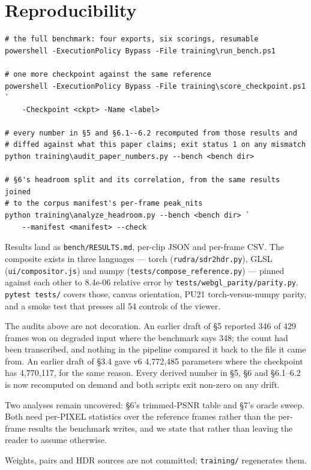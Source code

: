 \hypertarget{reproducibility}{%
\section{Reproducibility}\label{reproducibility}}

\begin{verbatim}
# the full benchmark: four exports, six scorings, resumable
powershell -ExecutionPolicy Bypass -File training\run_bench.ps1

# one more checkpoint against the same reference
powershell -ExecutionPolicy Bypass -File training\score_checkpoint.ps1 `
    -Checkpoint <ckpt> -Name <label>

# every number in §5 and §6.1--6.2 recomputed from those results and
# diffed against what this paper claims; exit status 1 on any mismatch
python training\audit_paper_numbers.py --bench <bench dir>

# §6's headroom split and its correlation, from the same results joined
# to the corpus manifest's per-frame peak_nits
python training\analyze_headroom.py --bench <bench dir> `
    --manifest <manifest> --check
\end{verbatim}

Results land as \texttt{bench/RESULTS.md}, per-clip JSON and per-frame CSV. The
composite exists in three languages --- torch (\texttt{rudra/sdr2hdr.py}), GLSL
(\texttt{ui/compositor.js}) and numpy (\texttt{tests/compose\_reference.py}) --- pinned against
each other to 8.4e-06 relative error by \texttt{tests/webgl\_parity/parity.py}.
\texttt{pytest\ tests/} covers those, canvas orientation, PU21 torch-versus-numpy
parity, and a smoke test that presses all 54 controls of the viewer.

The audits above are not decoration. An earlier draft of §5 reported 346 of 429
frames won on degraded input where the benchmark says 348; the count had been
transcribed, and nothing in the pipeline compared it back to the file it came
from. An earlier draft of §3.4 gave v6 4,772,485 parameters where the checkpoint
has 4,770,117, for the same reason. Every derived number in §5, §6 and §6.1--6.2
is now recomputed on demand and both scripts exit non-zero on any drift.

Two analyses remain uncovered: §6's trimmed-PSNR table and §7's oracle sweep.
Both need per-PIXEL statistics over the reference frames rather than the
per-frame results the benchmark writes, and we state that rather than leaving
the reader to assume otherwise.

Weights, pairs and HDR sources are not committed; \texttt{training/} regenerates them.

